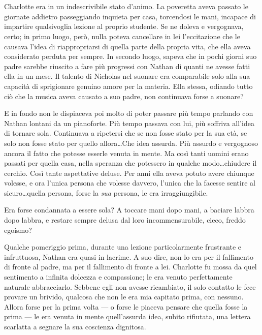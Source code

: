 \chapter{}
\label{ch:4}

Charlotte era in un indescrivibile stato d'animo. La poveretta aveva passato le giornate addietro
passeggiando inquieta per casa, torcendosi le mani, incapace di impartire qualsivoglia lezione al
proprio studente. Se ne doleva e vergognava, certo; in primo luogo, però, nulla poteva cancellare in
lei l'eccitazione che le causava l'idea di riappropriarsi di quella parte della propria vita, che
ella aveva considerato perduta per sempre. In secondo luogo, sapeva che in pochi giorni suo padre
sarebbe riuscito a fare più progressi con Nathan di quanti ne avesse fatti ella in un mese. Il
talento di Nicholas nel suonare era comparabile solo alla sua capacità di sprigionare genuino amore
per la materia. Ella stessa, odiando tutto ciò che la musica aveva causato a suo padre, non
continuava forse a suonare?

E in fondo non le dispiaceva poi molto di poter passare più tempo parlando con Nathan lontani da un
pianoforte. Più tempo passava con lui, più soffriva all'idea di tornare sola. Continuava a ripetersi
che se non fosse stato per la sua età, se solo non fosse stato per quello allora\dots Che idea
assurda. Più assurdo e vergognoso ancora il fatto che potesse esserle venuta in mente. Ma così tanti
uomini erano passati per quella casa, nella speranza che potessero in qualche modo\dots chiudere il
cerchio. Così tante aspettative deluse. Per anni ella aveva potuto avere chiunque volesse, e ora
l'unica persona che volesse davvero, l'unica che la facesse sentire al sicuro\dots quella persona,
forse la \emph{sua} persona, le era irraggiungibile.

Era forse condannata a essere sola? A toccare mani dopo mani, a baciare labbra dopo labbra, e
restare sempre delusa dal loro incommensurabile, cieco, freddo egoismo?

Qualche pomeriggio prima, durante una lezione particolarmente frustrante e infruttuosa, Nathan era
quasi in lacrime. A suo dire, non lo era per il fallimento di fronte al padre, ma per il fallimento
di fronte a lei. Charlotte fu mossa da quel sentimento a infinita dolcezza e compassione; le era
venuto perfettamente naturale abbracciarlo. Sebbene egli non avesse ricambiato, il solo contatto le
fece provare un brivido, qualcosa che non le era mia capitato prima, con nessuno. Allora forse per
la prima volta — o forse le piaceva pensare che quella fosse la prima — le era venuta in mente
quell'assurda idea, subito rifiutata, una lettera scarlatta a segnare la sua coscienza dignitosa.

